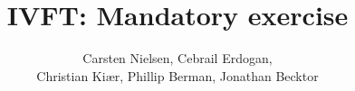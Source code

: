 \documentclass[a4paper]{report}
\title{IVFT: Mandatory exercise }
\author{Carsten Nielsen, Cebrail Erdogan, \\ Christian Kiær, Phillip Berman, Jonathan Becktor}
\date{} %
\begin{document}
\maketitle


\tableofcontents







\cite{LetterCon}

{}

\end{document}
